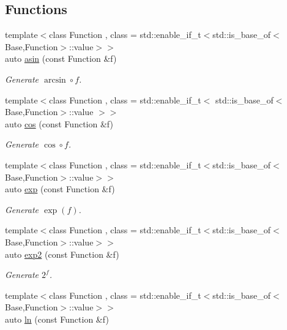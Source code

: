 \subsection*{Functions}
\begin{DoxyCompactItemize}
\item 
{\footnotesize template$<$class Function , class  = std\+::enable\+\_\+if\+\_\+t$<$std\+::is\+\_\+base\+\_\+of$<$\+Base,\+Function$>$\+::value$>$$>$ }\\auto \hyperlink{group__CMathGroup_gad26443b289325876cffdaadfca770d51}{asin} (const Function \&f)
\begin{DoxyCompactList}\small\item\em Generate $ \arcsin\circ f $. \end{DoxyCompactList}\item 
{\footnotesize template$<$class Function , class  = std\+::enable\+\_\+if\+\_\+t$<$ std\+::is\+\_\+base\+\_\+of$<$\+Base,\+Function$>$\+::value $>$$>$ }\\auto \hyperlink{group__CMathGroup_ga7e9b2ac717cd2350663293cb66ba6cbd}{cos} (const Function \&f)
\begin{DoxyCompactList}\small\item\em Generate $ \cos\circ f $. \end{DoxyCompactList}\item 
{\footnotesize template$<$class Function , class  = std\+::enable\+\_\+if\+\_\+t$<$std\+::is\+\_\+base\+\_\+of$<$\+Base,\+Function$>$\+::value$>$$>$ }\\auto \hyperlink{group__CMathGroup_ga00135c8521411f13813f9b972ea4e231}{exp} (const Function \&f)
\begin{DoxyCompactList}\small\item\em Generate $ \exp(f) $. \end{DoxyCompactList}\item 
{\footnotesize template$<$class Function , class  = std\+::enable\+\_\+if\+\_\+t$<$std\+::is\+\_\+base\+\_\+of$<$\+Base,\+Function$>$\+::value$>$$>$ }\\auto \hyperlink{group__CMathGroup_ga7724faf7db6e9583ac91df322c26ecf5}{exp2} (const Function \&f)
\begin{DoxyCompactList}\small\item\em Generate $2^f$. \end{DoxyCompactList}\item 
{\footnotesize template$<$class Function , class  = std\+::enable\+\_\+if\+\_\+t$<$std\+::is\+\_\+base\+\_\+of$<$\+Base,\+Function$>$\+::value$>$$>$ }\\auto \hyperlink{group__CMathGroup_ga31313571b08f65b853643e14fc8fc714}{ln} (const Function \&f)

\end{DoxyCompactItemize}
